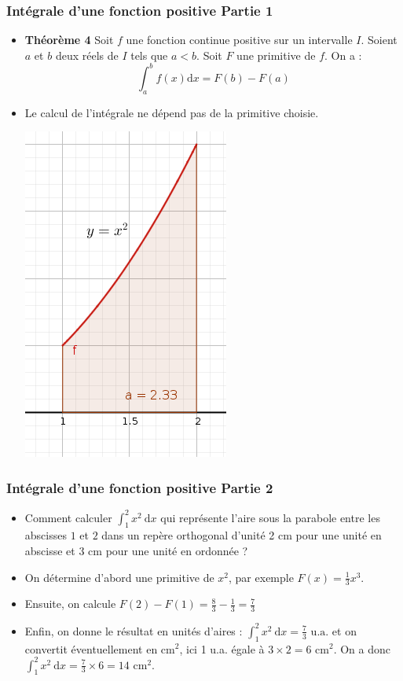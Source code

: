 \documentclass[11pt, hyperref={urlcolor=red,%
            linkcolor=blue, %
            colorlinks=true}]{beamer}
\newcommand{\dx}{\ensuremath{\text{d}x}}		%
\newcommand{\integralex}[3]{\int_{#1}^{#2} #3 \ \dx}
\begin{document}
\begin{frame}
\frametitle{Intégrale d'une fonction positive Partie 1}
\label{integrale}

\begin{itemize}
\item \textbf{Théorème 4 }  
Soit $f$ une fonction continue positive  sur un intervalle $I$. Soient $a$ et $b$ deux réels de $I$ tels que $a<b$. Soit $F$ une primitive de $f$. On a :\\
\[\displaystyle\int_{a}^{b}f(x)\dx=F(b)-F(a)\]

\pause \item \bcattention{} Le calcul de l'intégrale ne dépend pas de la primitive choisie.

\begin{center}
\includegraphics[scale=0.2]{ressources/parabole.png}
\end{center}

\end{itemize}

\end{frame}


\begin{frame}
\frametitle{Intégrale d'une fonction positive Partie 2}
\label{integrale}

\begin{itemize}
\item  Comment calculer $\integralex{1}{2}{x^{2}}$ qui représente l'aire sous la parabole entre les abscisses $1$ et $2$ dans un repère orthogonal d'unité 2 cm pour une unité en abscisse et 3 cm pour une unité en ordonnée ?
\pause \item On détermine d'abord une primitive de $x^{2}$, par exemple $F(x)=\frac{1}{3}x^{3}$. 
\pause \item Ensuite, on calcule $F(2)-F(1)=\frac{8}{3}-\frac{1}{3}=\frac{7}{3}$
\pause \item Enfin, on donne le résultat en unités d'aires :   $\integralex{1}{2}{x^{2}}=\frac{7}{3} \text{ u.a.}$
et on convertit éventuellement en cm$^{2}$, ici 1 u.a. égale à $3 \times 2 = 6 $ cm$^{2}$.
On a donc $\integralex{1}{2}{x^{2}}=\frac{7}{3} \times 6 = 14$ cm$^{2}$.
\end{itemize}

\end{frame}
\end{document}
